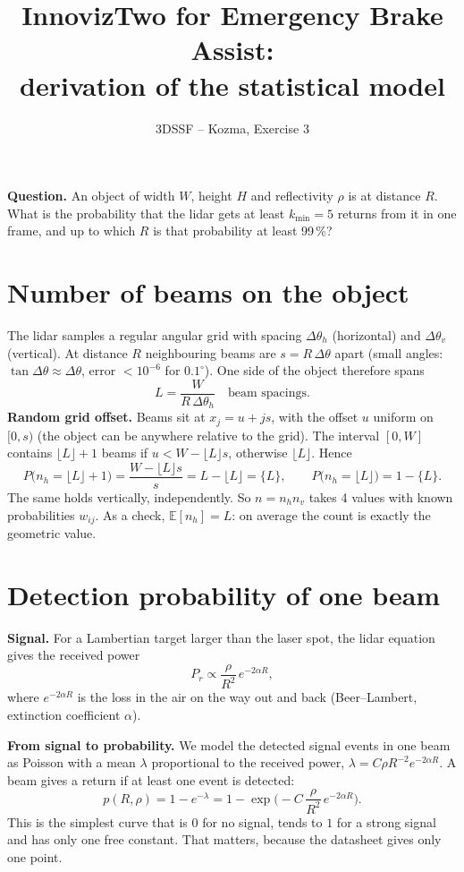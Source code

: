 \documentclass[11pt,a4paper]{article}
\title{InnovizTwo for Emergency Brake Assist:\\ derivation of the statistical model}
\author{3DSSF -- Kozma, Exercise 3}
\date{}
\begin{document}
\maketitle

\noindent\textbf{Question.} An object of width $W$, height $H$ and reflectivity $\rho$ is at distance $R$.
What is the probability that the lidar gets at least $k_{\min}=5$ returns from it in one frame,
and up to which $R$ is that probability at least 99\,\%?

\section{Number of beams on the object}

The lidar samples a regular angular grid with spacing $\Delta\theta_h$ (horizontal) and
$\Delta\theta_v$ (vertical). At distance $R$ neighbouring beams are $s = R\,\Delta\theta$ apart
(small angles: $\tan\Delta\theta \approx \Delta\theta$, error $< 10^{-6}$ for $0.1^\circ$).
One side of the object therefore spans
\[
  L = \frac{W}{R\,\Delta\theta_h} \quad\text{beam spacings.}
\]
\textbf{Random grid offset.} Beams sit at $x_j = u + j s$, with the offset $u$ uniform on $[0,s)$
(the object can be anywhere relative to the grid). The interval $[0,W]$ contains
$\lfloor L\rfloor + 1$ beams if $u < W - \lfloor L\rfloor s$, otherwise $\lfloor L\rfloor$. Hence
\[
  P\big(n_h = \lfloor L\rfloor + 1\big) = \frac{W - \lfloor L\rfloor s}{s} = L - \lfloor L\rfloor = \{L\},
  \qquad P\big(n_h = \lfloor L\rfloor\big) = 1 - \{L\}.
\]
The same holds vertically, independently. So $n = n_h n_v$ takes 4 values with known probabilities
$w_{ij}$. As a check, $\mathbb{E}[n_h] = L$: on average the count is exactly the geometric value.

\section{Detection probability of one beam}

\textbf{Signal.} For a Lambertian target larger than the laser spot, the lidar equation gives the
received power
\[
  P_r \propto \frac{\rho}{R^2}\, e^{-2\alpha R},
\]
where $e^{-2\alpha R}$ is the loss in the air on the way out and back (Beer--Lambert, extinction
coefficient $\alpha$).

\textbf{From signal to probability.} We model the detected signal events in one beam as Poisson
with a mean $\lambda$ proportional to the received power, $\lambda = C\rho R^{-2}e^{-2\alpha R}$.
A beam gives a return if at least one event is detected:
\[
  p(R,\rho) = 1 - e^{-\lambda} = 1 - \exp\!\Big(-C\,\frac{\rho}{R^2}\,e^{-2\alpha R}\Big).
\]
This is the simplest curve that is $0$ for no signal, tends to $1$ for a strong signal and has
only one free constant. That matters, because the datasheet gives only one point.
\end{document}
